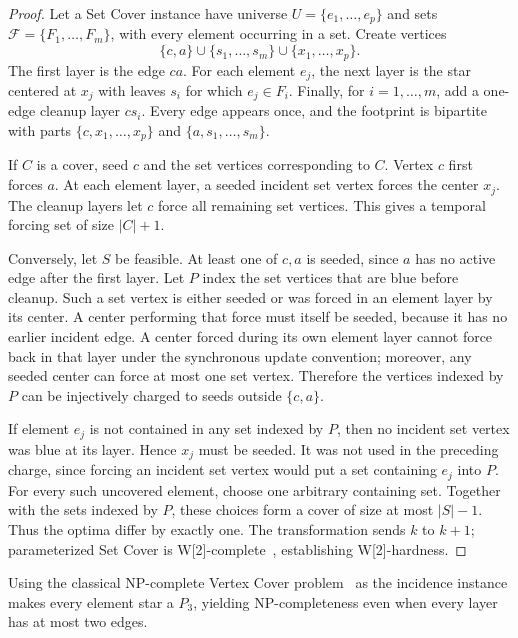 \documentclass[11pt]{article}
\theoremstyle{definition}
\theoremstyle{remark}
\begin{document}
\begin{proof}
Let a Set Cover instance have universe
$U=\{e_1,\ldots,e_p\}$ and sets $\mathcal F=\{F_1,\ldots,F_m\}$, with
every element occurring in a set.  Create vertices
\[
 \{c,a\}\cup\{s_1,\ldots,s_m\}\cup\{x_1,\ldots,x_p\}.
\]
The first layer is the edge $ca$.  For each element $e_j$, the next layer is
the star centered at $x_j$ with leaves $s_i$ for which $e_j\in F_i$.
Finally, for $i=1,\ldots,m$, add a one-edge cleanup layer $cs_i$.  Every edge
appears once, and the footprint is bipartite with parts
$\{c,x_1,\ldots,x_p\}$ and $\{a,s_1,\ldots,s_m\}$.

If $C$ is a cover, seed $c$ and the set vertices corresponding to $C$.
Vertex $c$ first forces $a$.  At each element layer, a seeded incident set
vertex forces the center $x_j$.  The cleanup layers let $c$ force all
remaining set vertices.  This gives a temporal forcing set of size
$|C|+1$.

Conversely, let $S$ be feasible.  At least one of $c,a$ is seeded, since $a$
has no active edge after the first layer.  Let $P$ index the set vertices
that are blue before cleanup.  Such a set vertex is either seeded or was
forced in an element layer by its center.  A center performing that force
must itself be seeded, because it has no earlier incident edge.  A center
forced during its own element layer cannot force back in that layer under the
synchronous update convention; moreover, any seeded center can force at most
one set vertex.  Therefore the vertices indexed by $P$ can
be injectively charged to seeds outside $\{c,a\}$.

If element $e_j$ is not contained in any set indexed by $P$, then no incident
set vertex was blue at its layer.  Hence $x_j$ must be seeded.  It was not
used in the preceding charge, since forcing an incident set vertex would put
a set containing $e_j$ into $P$.  For every such uncovered element, choose
one arbitrary containing set.  Together with the sets indexed by $P$, these
choices form a cover of size at most $|S|-1$.  Thus the optima differ by
exactly one.  The transformation sends $k$ to $k+1$; parameterized Set Cover
is W[2]-complete~\cite{downeyfellows2013}, establishing W[2]-hardness.
\end{proof}

Using the classical NP-complete Vertex Cover problem~\cite{gareyjohnson1979}
as the incidence instance makes every element star a $P_3$, yielding
NP-completeness even when every layer has at most two edges.
\end{document}
